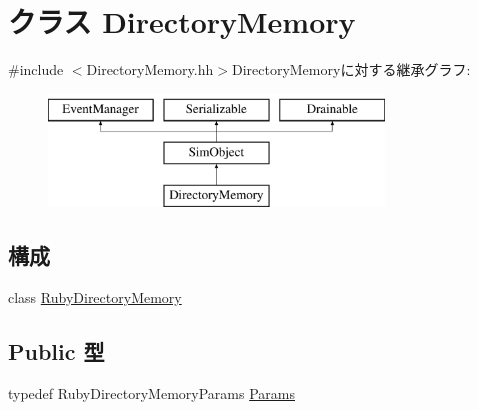 \hypertarget{classDirectoryMemory}{
\section{クラス DirectoryMemory}
\label{classDirectoryMemory}
}


{\ttfamily \#include $<$DirectoryMemory.hh$>$}DirectoryMemoryに対する継承グラフ:\begin{figure}[H]
\begin{center}
\leavevmode
\includegraphics[height=3cm]{classDirectoryMemory}
\end{center}
\end{figure}
\subsection*{構成}
\begin{DoxyCompactItemize}
\item 
class \hyperlink{classDirectoryMemory_1_1RubyDirectoryMemory}{RubyDirectoryMemory}
\end{DoxyCompactItemize}
\subsection*{Public 型}
\begin{DoxyCompactItemize}
\item 
typedef RubyDirectoryMemoryParams \hyperlink{classDirectoryMemory_aafb743d69401c676144ae89b3d302665}{Params}
\end{DoxyCompactItemize}
